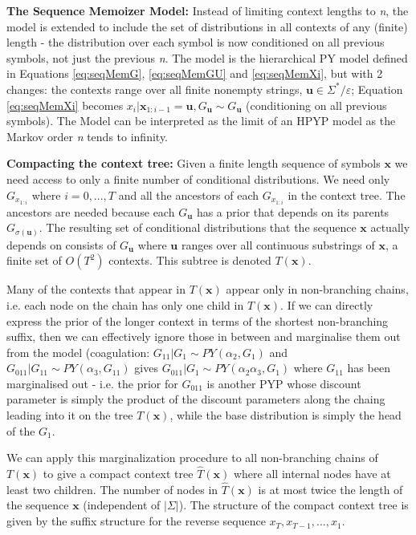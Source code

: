 \textbf{The Sequence Memoizer Model:} Instead of limiting context lengths to \textit{n}, the model is extended to include the set of distributions in all contexts of any (finite) length - the distribution over each symbol is now conditioned on all previous symbols, not just the previous \textit{n}. The model is the hierarchical PY model defined in Equations \ref{eq:seqMemG}, \ref{eq:seqMemGU} and \ref{eq:seqMemXi}, but with 2 changes: the contexts range over all finite nonempty strings, $\boldsymbol{u}\in \Sigma^{*}/\varepsilon$; Equation \ref{eq:seqMemXi} becomes $x_{i}|\boldsymbol{x}_{1:i-1}=\boldsymbol{u}, G_{\boldsymbol{u}}\sim G_{\boldsymbol{u}}$ (conditioning on all previous symbols). The Model can be interpreted as the limit of an HPYP model as the Markov order \textit{n} tends to infinity.

\textbf{Compacting the context tree:} Given a finite length sequence of symbols $\boldsymbol{x}$ we need access to only a finite number of conditional distributions. We need only $G_{x_{1:i}}$ where $i=0, ..., T$ and all the ancestors of each $G_{x_{1:i}}$ in the context tree. The ancestors are needed because each $G_{\boldsymbol{u}}$ has a prior that depends on its parents $G_{\sigma(\boldsymbol{u})}$. The resulting set of conditional distributions that the sequence $\boldsymbol{x}$ actually depends on consists of $G_{\boldsymbol{u}}$ where $\boldsymbol{u}$ ranges over all continuous substrings of $\boldsymbol{x}$, a finite set of $O(T^2)$ contexts. This subtree is denoted $T(\boldsymbol{x})$.

Many of the contexts that appear in $T(\boldsymbol{x})$ appear only in non-branching chains, i.e. each node on the chain has only one child in $T(\boldsymbol{x})$. If we can directly express the prior of the longer context in terms of the shortest non-branching suffix, then we can effectively ignore those in between and marginalise them out from the model (coagulation: $G_{11}|G_{1}\sim PY(\alpha_{2}, G_{1})$ and $G_{011}|G_{11}\sim PY(\alpha_{3}, G_{11})$ gives $G_{011}|G_{1}\sim PY(\alpha_{2}\alpha_{3}, G_{1})$ where $G_{11}$ has been marginalised out - i.e. the prior for $G_{011}$ is another PYP whose discount parameter is simply the product of the discount parameters along the chaing leading into it on the tree $T(\boldsymbol{x})$, while the base distribution is simply the head of the $G_{1}$.

We can apply this marginalization procedure to all non-branching chains of $T(\boldsymbol{x})$ to give a compact context tree $\hat{T}(\boldsymbol{x})$ where all internal nodes have at least two children. The number of nodes in $\hat{T}(\boldsymbol{x})$ is at most twice the length of the sequence $\boldsymbol{x}$ (independent of $|\Sigma|$). The structure of the compact context tree is given by the suffix structure for the reverse sequence $x_{T}, x_{T-1}, ..., x_{1}$.

